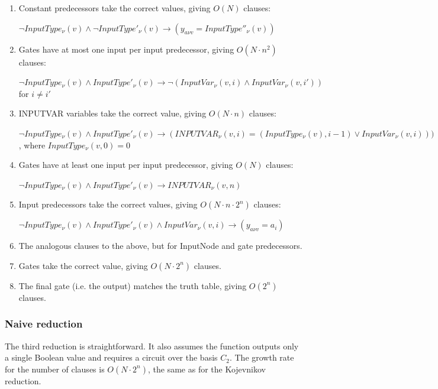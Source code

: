 \documentclass{article}
\begin{document}
\begin{enumerate}

  \item Constant predecessors take the correct values, giving $O(N)$ clauses:

  $\neg InputType_\nu(v) \land \neg InputType'_\nu(v) \rightarrow (y_{a \nu v} = InputType''_\nu(v))$

  \item Gates have at most one input per input predecessor, giving $O(N \cdot n^2)$ clauses:

  $\neg InputType_\nu(v) \land InputType'_\nu(v) \rightarrow \neg (InputVar_\nu(v,i) \land InputVar_\nu(v,i'))$ for $i \neq i'$

  \item INPUTVAR variables take the correct value, giving $O(N \cdot n)$ clauses:

  $\neg InputType_\nu(v) \land InputType'_\nu(v) \rightarrow (INPUTVAR_\nu(v,i) = (InputType_\nu(v),i-1) \lor InputVar_\nu(v,i)))$, where $InputType_\nu(v,0) = 0$

  \item Gates have at least one input per input predecessor, giving $O(N)$ clauses:

  $\neg InputType_\nu(v) \land InputType'_\nu(v) \rightarrow INPUTVAR_\nu(v,n)$

  \item Input predecessors take the correct values, giving $O(N \cdot n \cdot 2^n)$ clauses:

  $\neg InputType_\nu(v) \land InputType'_\nu(v) \land InputVar_\nu(v,i) \rightarrow (y_{a \nu v} = a_i)$

  \item The analogous clauses to the above, but for InputNode and gate predecessors. 

  \item Gates take the correct value, giving $O(N \cdot 2^n)$ clauses.

  \item The final gate (i.e. the output) matches the truth table, giving $O(2^n)$ clauses.

\end{enumerate}

\subsubsection{Naive reduction}

The third reduction is straightforward. It also assumes the function outputs only a single Boolean value and requires a circuit over the basis \(C_2\). The growth rate for the number of clauses is $O(N \cdot 2^n)$, the same as for the Kojevnikov reduction.
\end{document}

